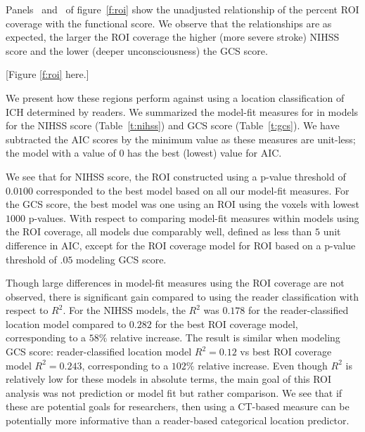 \documentclass[10pt]{article}\usepackage[]{graphicx}\usepackage[]{color}
\begin{document}
Panels~\protect{} and~\protect{} of figure~\ref{f:roi} show the unadjusted relationship of the percent ROI coverage with the functional score.  We observe that the relationships are as expected, the larger the ROI coverage the higher (more severe stroke) NIHSS score and the lower (deeper unconsciousness) the GCS score.

[Figure \ref{f:roi} here.]











We present how these regions perform against using a location classification of ICH determined by readers.  We summarized the model-fit measures for in models for the NIHSS score (Table~\ref{t:nihss}) and GCS score (Table~\ref{t:gcs}).  We have subtracted the AIC scores by the minimum value as these measures are unit-less; the model with a value of $0$ has the best (lowest) value for AIC.  

We see that for NIHSS score, the ROI constructed using a p-value threshold of $0.0100$ corresponded to the best model based on all our model-fit measures.  For the GCS score, the best model was one using an ROI using the voxels with lowest $1000$ p-values.  With respect to comparing model-fit measures within models using the ROI coverage, all models due comparably well, defined as less than $5$ unit difference in AIC, except for the ROI coverage model for ROI based on a p-value threshold of $.05$ modeling GCS score.

Though large differences in model-fit measures using the ROI coverage are not observed, there is significant gain compared to using the reader classification with respect to $R^2$.
For the NIHSS models, the $R^2$ was $0.178$ for the reader-classified location model compared to $0.282$ for the best ROI coverage model, corresponding to a $58\%$ relative increase.  The result is similar when modeling GCS score: reader-classified location model $R^2 = 0.12$ vs best ROI coverage model $R^2 = 0.243$, corresponding to a $102\%$ relative increase.  Even though $R^2$ is relatively low for these models in absolute terms, the main goal of this ROI analysis was not prediction or model fit but rather comparison.  We see that if these are potential goals for researchers, then using a CT-based measure can be potentially more informative than a reader-based categorical location predictor. 
\end{document}
